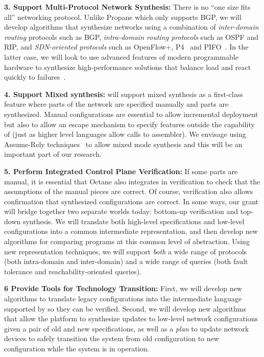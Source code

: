 {\bf 3. Support Multi-Protocol Network Synthesis:}  There is no ``one size fits all'' networking protocol. Unlike Propane which only supports BGP, we will develop algorithms that synthesize networks using a combination of \emph{inter-domain routing} protocols such as BGP, \emph{intra-domain routing protocols} such as OSPF and RIP, and 
\emph{SDN-oriented protocols} such as OpenFlow+\cite{openflow}, P4~\cite{P4} and PIFO~\cite{PIFO}.  In the latter case, we will look to use advanced features
of modern programmable hardware to synthesize high-performance
solutions that balance load and react quickly to failures~\cite{conga,hula}.

{\bf 4. Support Mixed synthesis:} \Propane will support mixed synthesis as a first-class feature where parts of the network are specified manually and parts are synthesized.  Manual configurations are essential to allow incremental deployment but also to allow an escape mechanism to specify features outside the capability of \Propane (just as higher level languages allow calls to assembler).  We envisage using Assume-Rely techniques~\cite{assume} to allow mixed mode synthesis and this will be an important part of our research.

{\bf 5. Perform Integrated Control Plane Verification:}  If some parts are manual, it is essential that Octane also integrates in verification to check that the assumptions of the manual pieces are correct.   Of course, verification also allows confirmation that synthesized configurations are correct.  In some ways, our grant will bridge together two separate worlds today: bottom-up verification and top-down synthesis.  We will translate both high-level specifications and low-level configurations into a common intermediate representation, and then develop new algorithms for
comparing programs at this common level of abstraction.  Using new representation techniques, we will support \emph{both} a wide range of protocols (both intra-domain and inter-domain) and a wide range of queries (both fault tolerance and reachability-oriented queries).

{\bf 6  Provide Tools for Technology Transition:}  First, we will develop new algorithms to translate legacy configurations into  the intermediate language supported by \Propane so they can be verified.
Second, we will develop new algorithms that allow the \Propane platform to synthesize
updates to low-level network configurations given a pair of old and new \Propane specifications, as well as a \emph{plan} to update network devices to
safely transition the system from old configuration to new configuration while the system is in operation.

